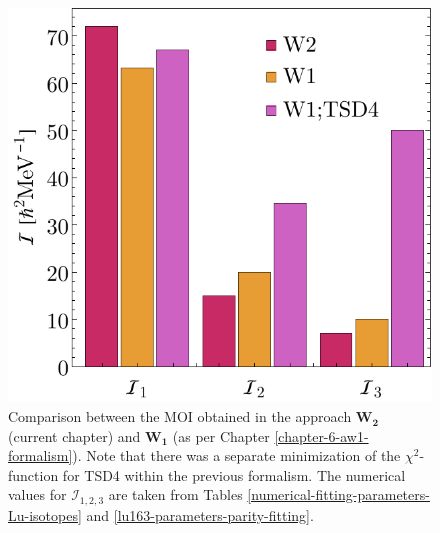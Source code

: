 \begin{figure}
    \centering
    \includegraphics[scale=0.75]{Chapters/Figures/parity-partners-plots/W1-W2-Mois.pdf}
    \caption{Comparison between the MOI obtained in the approach $\mathbf{W_2}$ (current chapter) and $\mathbf{W_1}$ (as per Chapter \ref{chapter-6-aw1-formalism}). Note that there was a separate minimization of the $\chi^2$-function for TSD4 within the previous formalism. The numerical values for $\mathcal{I}_{1,2,3}$ are taken from Tables \ref{numerical-fitting-parameters-Lu-isotopes} and \ref{lu163-parameters-parity-fitting}.}
    \label{moi-comparison-w1-w2-formalisms}
\end{figure}


